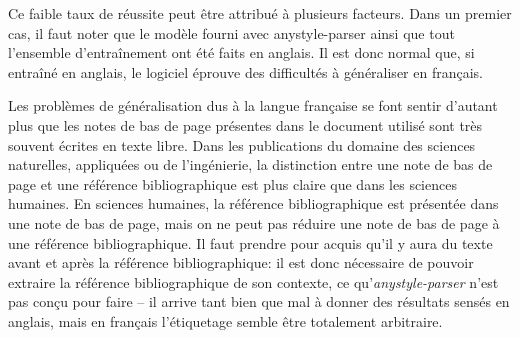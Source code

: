 Ce faible taux de réussite peut être attribué à plusieurs facteurs. Dans un premier cas, il faut noter que le modèle fourni avec anystyle-parser ainsi que tout l'ensemble d'entraînement ont été faits en anglais. Il est donc normal que, si entraîné en anglais, le logiciel éprouve des difficultés à généraliser en français.

Les problèmes de généralisation dus à la langue française se font sentir d'autant plus que les notes de bas de page présentes dans le document utilisé sont très souvent écrites en texte libre. Dans les publications du domaine des sciences naturelles, appliquées ou de l'ingénierie, la distinction entre une note de bas de page et une référence bibliographique est plus claire que dans les sciences humaines. En sciences humaines, la référence bibliographique est présentée dans une note de bas de page, mais on ne peut pas réduire une note de bas de page à une référence bibliographique. Il faut prendre pour acquis qu'il y aura du texte avant et après la référence bibliographique: il est donc nécessaire de pouvoir extraire la référence bibliographique de son contexte, ce qu'\emph{anystyle-parser} n'est pas conçu pour faire -- il arrive tant bien que mal à donner des résultats sensés en anglais, mais en français l'étiquetage semble être totalement arbitraire.
